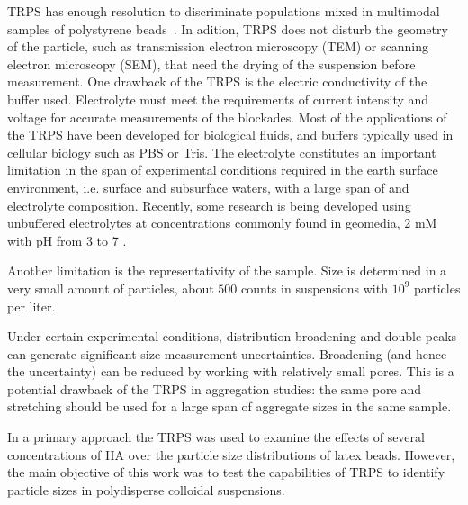 \documentclass[journal=langd5,manuscript=article]{achemso}
\begin{document}

TRPS has enough resolution to discriminate populations mixed in multimodal samples of polystyrene beads~\cite{Varenne2016MultimodalMethods}.  In adition, TRPS does not disturb the geometry of the particle, such as  transmission electron microscopy (TEM) or scanning electron microscopy (SEM), that need the drying of the suspension before measurement.
One drawback of the TRPS is the electric conductivity of the buffer used. Electrolyte must meet the requirements of current intensity and voltage for accurate measurements of the blockades.
Most of the applications of the TRPS have been developed for biological fluids, and buffers typically used in cellular biology  such as PBS or Tris. The electrolyte constitutes an important limitation in the span of  experimental conditions  required in the  earth surface environment, i.e. surface and subsurface waters, with a large  span of  and electrolyte composition. Recently, some research is being developed using unbuffered electrolytes at concentrations commonly found in geomedia, 2 mM  with   pH from  3 to 7 \cite{Mayne2016} .



%
Another limitation is the representativity of the sample. Size is determined in a very small amount of particles, about  $500$ counts in suspensions with $10^9$ particles per liter.



 Under certain experimental conditions, distribution broadening and double peaks can generate significant
 size measurement uncertainties. Broadening (and hence the uncertainty) can be reduced by working with
 relatively small pores\cite{Weatherall2016}. This is a potential drawback of the TRPS in aggregation studies:
 the same pore and stretching  should be used for a large span of aggregate sizes in the same sample.
 


In a primary approach the TRPS was used to examine the effects of several concentrations of HA over  the particle size distributions of latex beads. However, the main objective of this work was to test the capabilities of TRPS to identify particle sizes in  polydisperse colloidal suspensions.
\end{document}

